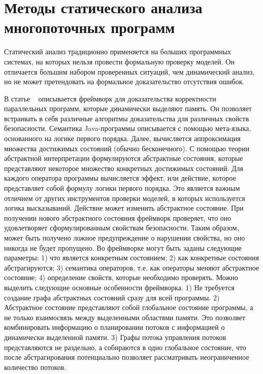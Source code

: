 
\section{Методы статического анализа многопоточных программ}
\label{rw:static}
Статический анализ традиционно применяется на больших программных системах, на которых нельзя провести формальную проверку моделей. Он отличается большим набором проверенных ситуаций, чем динамический анализ, но не может претендовать на формальное доказательство отсутствия ошибок.

В статье ~\cite{Yahav:2008} описывается фреймворк для доказательства корректности параллельных программ, которые динамически выделяют память. Он позволяет встраивать в себя различные алгоритмы доказательства для различных свойств безопасности. Семантика Java-программы описывается с помощью мета-языка, основанного на логике первого порядка. Далее, вычисляется аппроксимация множества достижимых состояний (обычно бесконечного). С помощью теории абстрактной интерпретации формулируются абстрактные состояния, которые представляют некоторое множество конкретных достижимых состояний. Для каждого оператора программы вычисляется эффект, или действие, которое представляет собой формулу логики первого порядка. Это является важным отличием от других инструментов проверки моделей, в которых используется логика высказываний.
Действие может изменить абстрактное состояние. При получении нового абстрактного состояния фреймворк проверяет, что оно удовлетворяет сформулированным свойствам безопасности. Таким образом, может быть получено ложное предупреждение о нарушении свойства, но оно никогда не будет пропущено.
Во фреймворке могут быть заданы следующие параметры:
1) что является конкретным состоянием;
2) как конкретные состояния абстрагируются;
3) семантика операторов, т.е. как операторы меняют абстрактное состояние;
4) определение свойств, которые необходимо проверять.
Можно выделить следующие основные особенности фреймворка.
1) Не требуется создание графа абстрактных состояний сразу для всей программы.
2) Абстрактное состояние представляют собой глобальное состояние программы, а не только взаимосвязь между выделенными областями памяти. Это позволяет комбинировать информацию о планировании потоков с информацией о динамически выделенной памяти.
3) Графы потока управления потоков представляются не раздельно, а собираются в одно глобальное состояние, что после абстрагирования потенциально позволяет рассматривать неограниченное количество потоков.
